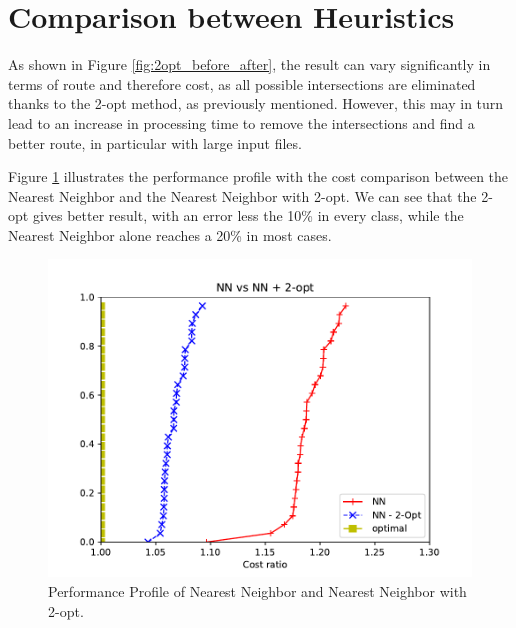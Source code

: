 \newpage

\section{Comparison between Heuristics}
As shown in Figure \ref{fig:2opt_before_after}, the result can vary significantly in terms of route and therefore cost, as all possible intersections are eliminated thanks to the 2-opt method, as previously mentioned. However, this may in turn lead to an increase in processing time to remove the intersections and find a better route, in particular with large input files.

Figure \ref{fig:NN_2opt} illustrates the performance profile with the cost comparison between the Nearest Neighbor and the Nearest Neighbor with 2-opt. We can see that the 2-opt gives better result, with an error less the 10\% in every class, while the Nearest Neighbor alone reaches a 20\% in most cases.

\begin{figure}[H]
    \centering
    \includegraphics[width=0.7\linewidth]{Immagini/NN vs 2Opt.pdf}
    \caption{Performance Profile of Nearest Neighbor and Nearest Neighbor with 2-opt.}
    \label{fig:NN_2opt}
\end{figure}
